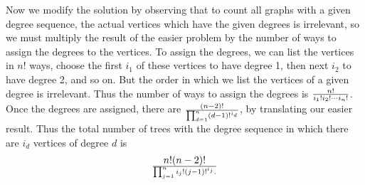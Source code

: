 \begin{enumerate}
{Now we modify the solution by observing that to count all graphs with a given
degree sequence, the actual vertices which have the given degrees is
irrelevant, so we must multiply the result of the easier problem by the number
of ways to assign the degrees to the vertices.  To assign the degrees, we can
list the vertices in $n!$ ways, choose the first $i_1$ of these vertices to
have degree 1, then next $i_2$ to have degree 2, and so on.  But the order
in which we list the vertices of a given degree is irrelevant.  Thus the number
of ways to assign the degrees is
$n!\over i_1!i_2!\cdots i_n!$.  Once the degrees are assigned, there are
$(n-2)!\over
\prod_{d=1}^n (d-1)!^{i_d}$, by translating our easier result.  Thus the total
number of trees with the degree sequence in which there are $i_d$ vertices of
degree $d$ is
$$n!(n-2)!\over\prod_{j=1}^n i_j!(j-1)!^{i_j}.$$}

\end{enumerate}